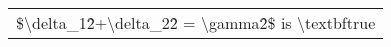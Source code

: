 \begin{tabular}{r}
\$\textbackslash delta\_1\^2+\textbackslash delta\_2\^2 = \textbackslash gamma\^2\$ is \textbackslash textbf{true} \\
\end{tabular}%

